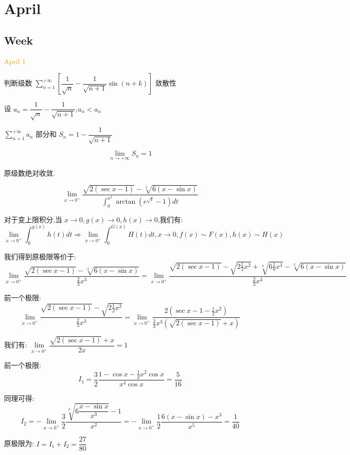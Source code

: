 \chapter{April}
\section{Week }
\textcolor{orange}{April 1}

\begin{example}[][Exam: 30.1.1]
	判断级数 $\sum\limits_{n=1}^{+\infty}\left[\dfrac{1}{\sqrt{n}}-\dfrac{1}{\sqrt{n+1}}\sin(n+k)\right]$ 敛散性
\end{example}

\begin{solution}
	
	设 $a_{n}=\dfrac{1}{\sqrt{n}}-\dfrac{1}{\sqrt{n+1}}$,$u_{n}<a_{n}$
	
	$\sum\limits_{n=1}^{+\infty}a_{n}$ 部分和 $S_{n}=1-\dfrac{1}{\sqrt{n+1}}$
	
	$$\lim\limits_{n\to +\infty}S_{n}=1$$
	
	原级数绝对收敛.
\end{solution}

\begin{example}[][Exam: 30.1.2]
	$$\lim\limits_{x\to 0^{+}}\dfrac{\sqrt{2(\sec x-1)}-\sqrt[3]{6(x-\sin x)}}{\int_{0}^{x^2}\arctan (e^{\sqrt{t}}-1)dt}$$
\end{example}

\begin{solution}
	
	对于变上限积分,当 $x\to 0,g(x)\to 0,h(x)\to 0$,我们有: 
	$$\lim\limits_{x\to 0^{+}}\int_{0}^{g(x)}h(t)dt\Rightarrow \lim\limits_{x\to 0^{+}}\int_{0}^{G(x)}H(t)dt,x\to 0,f(x)\sim F(x),h(x)\sim H(x)$$
	
	我们得到原极限等价于: 
	$$\lim\limits_{x\to 0^{+}}\frac{\sqrt{2(\sec x-1)}-\sqrt[3]{6(x-\sin x)}}{\frac{2}{3}x^3}=\lim\limits_{x\to 0^{+}}\frac{\sqrt{2(\sec x-1)}-\sqrt{2\frac{1}{2}x^2}+\sqrt[3]{6\frac{1}{6}x^3}-\sqrt[3]{6(x-\sin x)}}{\frac{2}{3}x^3}$$
	
	前一个极限: $$\lim\limits_{x\to 0^{+}}\frac{\sqrt{2(\sec x-1)}-\sqrt{2\frac{1}{2}x^2}}{\frac{2}{3}x^3}=\lim\limits_{x\to 0^{+}}\frac{2(\sec x-1-\frac{1}{2}x^2)}{\frac{2}{3}x^3(\sqrt{2(\sec x-1)}+x)}$$
	
	我们有: $\lim\limits_{x\to 0^{+}}\dfrac{\sqrt{2(\sec x-1)}+x}{2x}=1$
	
	前一个极限: $$I_{1}=\frac{3}{2}\frac{1-\cos x-\frac{1}{2}x^2\cos x}{x^4\cos x}=\frac{5}{16}$$
	
	同理可得: $$I_{2}=-\lim\limits_{x\to 0^{+}}\frac{3}{2}\frac{\sqrt[3]{6\dfrac{x-\sin x}{x^3}}-1}{x^2}=-\lim\limits_{x\to 0^{+}}\frac{1}{2}\frac{6(x-\sin x)-x^3}{x^5}=\frac{1}{40}$$
	
	原极限为: $I=I_{1}+I_{2}=\dfrac{27}{80}$
\end{solution}


